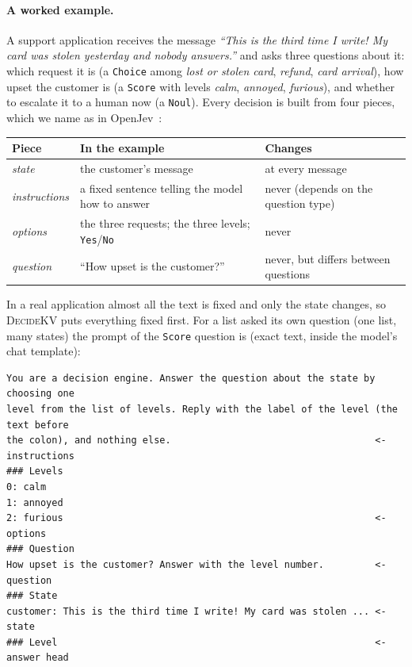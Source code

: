 \documentclass[11pt]{article}
\newcommand{\dkv}{\textsc{DecideKV}}
\begin{document}
\paragraph{A worked example.} A support application receives the message \emph{``This is the third time I write! My
card was stolen yesterday and nobody answers.''} and asks three questions about it: which request it is (a
\texttt{Choice} among \emph{lost or stolen card}, \emph{refund}, \emph{card arrival}), how upset the customer is (a
\texttt{Score} with levels \emph{calm}, \emph{annoyed}, \emph{furious}), and whether to escalate it to a human now (a
\texttt{Noul}). Every decision is built from four pieces, which we name as in OpenJev~\citep{openjev}:
\begin{center}\small
\begin{tabular}{lll}
\toprule
Piece & In the example & Changes \\
\midrule
\emph{state} & the customer's message & at every message \\
\emph{instructions} & a fixed sentence telling the model how to answer & never (depends on the question type) \\
\emph{options} & the three requests; the three levels; \texttt{Yes}/\texttt{No} & never \\
\emph{question} & ``How upset is the customer?'' & never, but differs between questions \\
\bottomrule
\end{tabular}
\end{center}
In a real application almost all the text is fixed and only the state changes, so \dkv{} puts everything fixed
first. For a list asked its own question (one list, many states) the prompt of the \texttt{Score} question is (exact
text, inside the model's chat template):
\begin{center}
\begin{minipage}{0.92\linewidth}\footnotesize
\begin{verbatim}
You are a decision engine. Answer the question about the state by choosing one
level from the list of levels. Reply with the label of the level (the text before
the colon), and nothing else.                                    <- instructions
### Levels
0: calm
1: annoyed
2: furious                                                       <- options
### Question
How upset is the customer? Answer with the level number.         <- question
### State
customer: This is the third time I write! My card was stolen ... <- state
### Level                                                        <- answer head
\end{verbatim}
\end{minipage}
\end{center}
\end{document}
